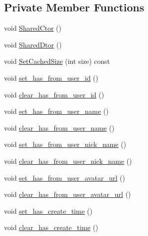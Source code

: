 \subsection*{Private Member Functions}
\begin{DoxyCompactItemize}
\item 
void \hyperlink{class_i_m_1_1_base_define_1_1_client_msg_info_a655c4e68e12f0fafce14ebad8bdb05ec}{Shared\+Ctor} ()
\item 
void \hyperlink{class_i_m_1_1_base_define_1_1_client_msg_info_a9c16139fca392ce7b34706246908b50c}{Shared\+Dtor} ()
\item 
void \hyperlink{class_i_m_1_1_base_define_1_1_client_msg_info_ad1db1089ad1adce841f94b7d06f8efc1}{Set\+Cached\+Size} (int size) const 
\item 
void \hyperlink{class_i_m_1_1_base_define_1_1_client_msg_info_a809ab5c3e5a57d10eb69ecf004afb7f8}{set\+\_\+has\+\_\+from\+\_\+user\+\_\+id} ()
\item 
void \hyperlink{class_i_m_1_1_base_define_1_1_client_msg_info_a1b5d782ec81b7d56f24080d65474c026}{clear\+\_\+has\+\_\+from\+\_\+user\+\_\+id} ()
\item 
void \hyperlink{class_i_m_1_1_base_define_1_1_client_msg_info_a50c3efc495178a30acc18b4def2ec8e9}{set\+\_\+has\+\_\+from\+\_\+user\+\_\+name} ()
\item 
void \hyperlink{class_i_m_1_1_base_define_1_1_client_msg_info_aa42603ed9f86fda51f9ec5ec0f680e58}{clear\+\_\+has\+\_\+from\+\_\+user\+\_\+name} ()
\item 
void \hyperlink{class_i_m_1_1_base_define_1_1_client_msg_info_a88541291a2a31f729d4c3e36829ec9e5}{set\+\_\+has\+\_\+from\+\_\+user\+\_\+nick\+\_\+name} ()
\item 
void \hyperlink{class_i_m_1_1_base_define_1_1_client_msg_info_a43ccbef0e0ea1ad35015157b4d158aad}{clear\+\_\+has\+\_\+from\+\_\+user\+\_\+nick\+\_\+name} ()
\item 
void \hyperlink{class_i_m_1_1_base_define_1_1_client_msg_info_aec26ceba581ef623c49e3d3cf7ed355c}{set\+\_\+has\+\_\+from\+\_\+user\+\_\+avatar\+\_\+url} ()
\item 
void \hyperlink{class_i_m_1_1_base_define_1_1_client_msg_info_a42e0dad7a93386eeb3803beec9447bff}{clear\+\_\+has\+\_\+from\+\_\+user\+\_\+avatar\+\_\+url} ()
\item 
void \hyperlink{class_i_m_1_1_base_define_1_1_client_msg_info_af7daad514cfc610e40dfbf8f14c5666f}{set\+\_\+has\+\_\+create\+\_\+time} ()
\item 
void \hyperlink{class_i_m_1_1_base_define_1_1_client_msg_info_aee62ce61931ba1a92be4d368fe12e5b7}{clear\+\_\+has\+\_\+create\+\_\+time} ()

\end{DoxyCompactItemize}
